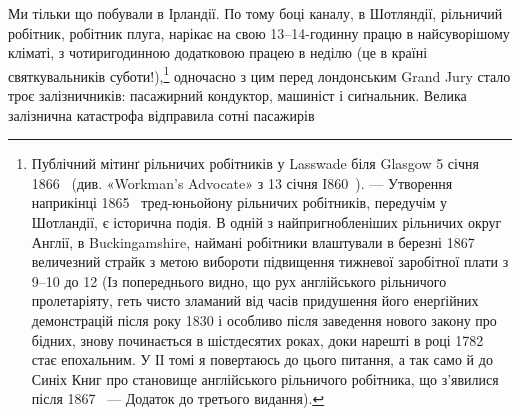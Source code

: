 Ми тільки що побували в Ірландії. По тому боці каналу, в
Шотляндії, рільничий робітник, робітник плуга, нарікає на свою
13--14-годинну працю в найсуворішому кліматі, з чотиригодинною
додатковою працею в неділю (це в країні святкувальників
суботи!),\footnote{
Публічний мітинґ рільничих робітників у Lasswade біля Glasgow
5 січня 1866~ (див. «Workman’s Advocate» з 13 січня I860~). — Утворення
наприкінці 1865~ тред-юньойону рільничих робітників, передучім
у Шотландії, є історична подія. В одній з найпригнобленіших рільничих
округ Англії, в Buckingamshire, наймані робітники влаштували
в березні 1867~ величезний страйк з метою вибороти підвищення тижневої
заробітної плати з 9--10 до 12 (Із попереднього
видно, що рух англійського рільничого пролетаріяту, геть чисто зламаний
від часів придушення його енерґійних демонстрацій після року 1830
і особливо після заведення нового закону про бідних, знову починається
в шістдесятих роках, доки нарешті в році 1782 стає епохальним. У ІІ томі
я повертаюсь до цього питання, а так само й до Синіх Книг про становище
англійського рільничого робітника, що з’явилися після 1867~ — Додаток
до третього видання).
} одночасно з цим перед лондонським Grand Jury стало
троє залізничників: пасажирний кондуктор, машиніст і сиґнальник.
Велика залізнична катастрофа відправила сотні пасажирів
\parbreak{}  %

